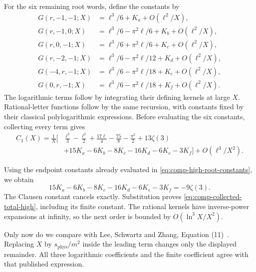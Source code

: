 For the six remaining root words, define the constants by
\begin{align}
 G(r,-1,-1;X)&=\ell^3/6+K_a+O(\ell^2/X),\\
 G(r,-1,0;X)&=\ell^3/6-\pi^2\ell/6+K_b+O(\ell^2/X),\\
 G(r,0,-1;X)&=\ell^3/6+\pi^2\ell/6+K_c+O(\ell^2/X),\\
 G(r,-2,-1;X)&=\ell^3/6-\pi^2\ell/12+K_d+O(\ell^2/X),\\
 G(-4,r,-1;X)&=\ell^3/6-\pi^2\ell/18+K_e+O(\ell^2/X),\\
 G(0,r,-1;X)&=\ell^3/6-\pi^2\ell/18+K_f+O(\ell^2/X).
\end{align}
The logarithmic terms follow by integrating their defining kernels at
large $X$. Rational-letter functions follow by the same recursion,
with constants fixed by their classical polylogarithmic expressions.
Before evaluating the six constants, collecting every term gives
\begin{equation}
\begin{aligned}
 C_1(X)=\frac1X\biggl[&\frac{\ell^3}{3}-\frac{\ell^2}{2}
 +\frac{17\ell}{4}-\frac{75}{8}-\frac{\pi^2}{2}+13\zeta(3)\\
 &+15K_a-6K_b-8K_c-16K_d-6K_e-3K_f\biggr]
 +O(\ell^3/X^2).
\end{aligned}
\end{equation}

Using the endpoint constants already evaluated in
\eqref{eq:comp-high-root-constants}, we obtain
\begin{equation}
 15K_a-6K_b-8K_c-16K_d-6K_e-3K_f=-9\zeta(3).
\end{equation}
The Clausen constant cancels exactly. Substitution proves
\eqref{eq:comp-collected-total-high}, including its finite constant.
The rational kernels have inverse-power expansions at infinity, so
the next order is bounded by $O(\ln^3X/X^2)$.

Only now do we compare with Lee, Schwartz and Zhang,
Equation (11)~\cite{qed-processes-lsz}. Replacing $X$ by
$s_{\mathrm{phys}}/m^2$ inside the leading term changes only the displayed
remainder. All three logarithmic coefficients and the finite
coefficient agree with that published expression.
